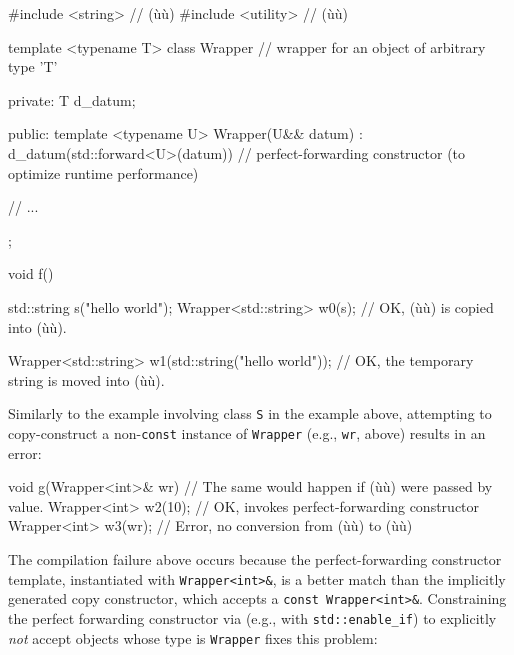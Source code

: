 \begin{emcppshiddenlisting}[emcppsbatch=e18]
#include <string>   // (ù{}ù)
#include <utility>  // (ù{}ù)
\end{emcppshiddenlisting}
\begin{emcppslisting}[emcppsbatch=e18]
template <typename T>
class Wrapper  // wrapper for an object of arbitrary type 'T'
{
private:
    T d_datum;

public:
    template <typename U>
    Wrapper(U&& datum) : d_datum(std::forward<U>(datum)) { }
        // perfect-forwarding constructor (to optimize runtime performance)

    // ...
};

void f()
{
    std::string s("hello world");
    Wrapper<std::string> w0(s);  // OK, (ù{}ù) is copied into (ù{}ù).

    Wrapper<std::string> w1(std::string("hello world"));
        // OK, the temporary string is moved into (ù{}ù).
}
\end{emcppslisting}

\noindent Similarly to the example involving class \lstinline!S! in the example above, attempting
to copy-construct a non-\lstinline!const! instance of \lstinline!Wrapper!
(e.g., \lstinline!wr!, above) results in an error:

\begin{emcppslisting}[emcppsbatch=e18]
void g(Wrapper<int>& wr)  // The same would happen if (ù{}ù) were passed by value.
{
    Wrapper<int> w2(10);  // OK, invokes perfect-forwarding constructor
    Wrapper<int> w3(wr);  // Error, no conversion from (ù{}ù) to (ù{}ù)
}
\end{emcppslisting}

\noindent The compilation failure above occurs because the perfect-forwarding
constructor template, instantiated with \lstinline!Wrapper<int>&!, is a
better match than the implicitly generated copy constructor, which
accepts a \lstinline!const!~\lstinline!Wrapper<int>&!. Constraining the
perfect forwarding constructor via  (e.g., with
\lstinline!std::enable_if!) to explicitly \emph{not} accept objects whose
type is \lstinline!Wrapper! fixes this problem:

